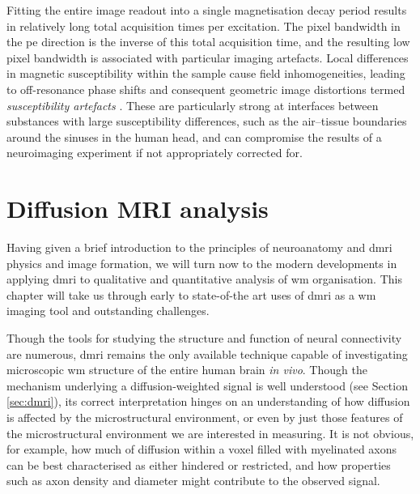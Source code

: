\documentclass[12pt,phd,a4paper,twoside]{ucl_thesis}
\begin{document}
Fitting the entire image readout into a single magnetisation decay period results in relatively long total acquisition times per excitation.
The pixel bandwidth in the \gls{pe} direction is the inverse of this total acquisition time, and the resulting low pixel bandwidth is associated with particular imaging artefacts.
Local differences in magnetic susceptibility within the sample cause field inhomogeneities, leading to off-resonance phase shifts and consequent geometric image distortions termed \textit{susceptibility artefacts} \autocite{Fischer1998}.
These are particularly strong at interfaces between substances with large susceptibility differences, such as the air--tissue boundaries around the sinuses in the human head, and can compromise the results of a neuroimaging experiment if not appropriately corrected for.
\clearpage{}
\clearpage{}\chapter{Diffusion MRI analysis}\label{chap:neuroimaging}

Having given a brief introduction to the principles of neuroanatomy and \gls{dmri} physics and image formation, we will turn now to the modern developments in applying \gls{dmri} to qualitative and quantitative analysis of \gls{wm} organisation.
This chapter will take us through early to state-of-the art uses of \gls{dmri} as a \gls{wm} imaging tool and outstanding challenges.

Though the tools for studying the structure and function of neural connectivity are numerous, \gls{dmri} remains the only available technique capable of investigating microscopic \gls{wm} structure of the entire human brain \textit{in vivo}.
Though the mechanism underlying a diffusion-weighted signal is well understood (see Section \ref{sec:dmri}), its correct interpretation hinges on an understanding of how diffusion is affected by the microstructural environment\autocite{LeBihan1995}, or even by just those features of the microstructural environment we are interested in measuring.
It is not obvious, for example, how much of diffusion within a voxel filled with myelinated axons can be best characterised as either hindered or restricted, and how properties such as axon density and diameter might contribute to the observed signal\autocite{Panagiotaki2012}.
\end{document}
